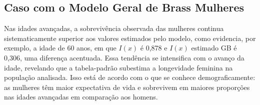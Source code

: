 \documentclass[
  12pt,
  a4paper,
]{scrreprt}
\begin{document}
\subsection{Caso com o Modelo Geral de Brass
Mulheres}\label{caso-com-o-modelo-geral-de-brass-mulheres}

Nas idades avançadas, a sobrevivência observada das mulheres continua
sistematicamente superior aos valores estimados pelo modelo, como
evidencia, por exemplo, a idade de 60 anos, em que \(I\left(x\right)\) é
0,878 e \(I\left(x\right)\) estimado GB é 0,306, uma diferença
acentuada. Essa tendência se intensifica com o avanço da idade,
revelando que a tabela-padrão subestima a longevidade feminina na
população analisada. Isso está de acordo com o que se conhece
demograficamente: as mulheres têm maior expectativa de vida e sobrevivem
em maiores proporções nas idades avançadas em comparação aos homens.
\end{document}
